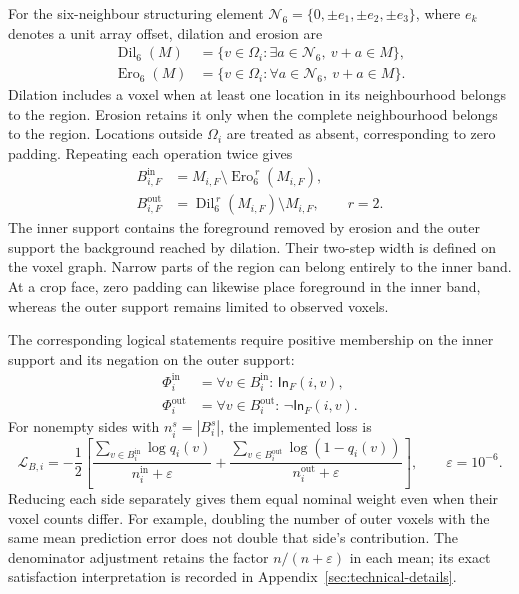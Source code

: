 \documentclass[12pt,a4paper]{article}
\begin{document}
For the six-neighbour structuring element
$\mathcal N_6=\{0,\pm e_1,\pm e_2,\pm e_3\}$, where $e_k$ denotes
a unit array offset, dilation and erosion are
\begin{equation}
\begin{aligned}
\operatorname{Dil}_6(M)
 &=\{v\in\Omega_i:\exists a\in\mathcal{N}_6,\ v+a\in M\},\\
\operatorname{Ero}_6(M)
 &=\{v\in\Omega_i:\forall a\in\mathcal{N}_6,\ v+a\in M\}.
\end{aligned}
\label{eq:band-morphology}
\end{equation}
Dilation includes a voxel when at least one location in its neighbourhood
belongs to the region. Erosion retains it only when the complete
neighbourhood belongs to the region. Locations outside $\Omega_i$ are
treated as absent, corresponding to zero padding. Repeating each
operation twice gives
\begin{equation}
\begin{aligned}
B_{i,F}^{\mathrm{in}}
 &=M_{i,F}\setminus\operatorname{Ero}_6^{\,r}(M_{i,F}),\\
B_{i,F}^{\mathrm{out}}
 &=\operatorname{Dil}_6^{\,r}(M_{i,F})\setminus M_{i,F},
\qquad r=2.
\end{aligned}
\label{eq:reference-boundary-bands}
\end{equation}
The inner support contains the foreground removed by erosion and the
outer support the background reached by dilation. Their two-step width
is defined on the voxel graph. Narrow parts of the region can belong
entirely to the inner band. At a crop face, zero padding can likewise
place foreground in the inner band, whereas the outer support remains
limited to observed voxels.

The corresponding logical statements require positive membership on
the inner support and its negation on the outer support:
\begin{equation}
\begin{aligned}
\Phi_i^{\mathrm{in}}
 &=\forall v\in B_i^{\mathrm{in}}:\,\mathsf{In}_{F}(i,v),\\
\Phi_i^{\mathrm{out}}
 &=\forall v\in B_i^{\mathrm{out}}:\,\lnot\mathsf{In}_{F}(i,v).
\end{aligned}
\label{eq:band-logical-statements}
\end{equation}
For nonempty sides with $n_i^s=|B_i^s|$, the implemented loss is
\begin{equation}
\mathcal L_{B,i}=-\frac12\left[
\frac{\sum_{v\in B_i^{\mathrm{in}}}\log q_i(v)}{n_i^{\mathrm{in}}+\varepsilon}
+\frac{\sum_{v\in B_i^{\mathrm{out}}}\log(1-q_i(v))}{n_i^{\mathrm{out}}+\varepsilon}
\right],\qquad \varepsilon=10^{-6}.
\label{eq:balanced-band-loss}
\end{equation}
Reducing each side separately gives them equal nominal weight even when
their voxel counts differ. For example, doubling the number of outer
voxels with the same mean prediction error does not double that side's
contribution. The denominator adjustment retains the factor
$n/(n+\varepsilon)$ in each mean; its exact satisfaction interpretation
is recorded in Appendix~\ref{sec:technical-details}.
\end{document}
